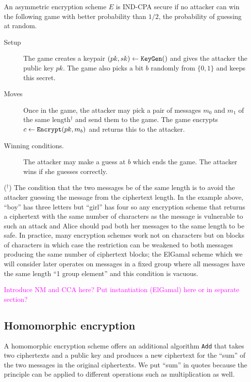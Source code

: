 \documentclass{llncs}
\newcommand{\alg}[1]{\textup{\texttt{#1}}}
\begin{document}
\begin{definition}
An asymmetric encryption scheme $E$ is IND-CPA secure if no attacker can win the
following game with better probability than $1/2$, the probability of guessing
at random.

\begin{description}
\item[Setup] The game creates a keypair $(pk, sk) \gets \alg{KeyGen}()$ and
gives the attacker the public key $pk$. The game also picks a bit $b$ randomly
from $\{0, 1\}$ and keeps this secret.
\item[Moves] Once in the game, the attacker may pick a pair of messages $m_0$
and $m_1$ of the same length$^\dagger$ and send them to the game. The game
encrypts $c \gets \alg{Encrypt} (pk, m_b)$ and returns this to the attacker.
\item[Winning conditions.] The attacker may make a guess at $b$ which ends the
game. The attacker wins if she guesses correctly.
\end{description}
\end{definition}

\noindent($^\dagger$) The condition that the two messages be of the same length
is to avoid the attacker guessing the message from the ciphertext length. In the
example above, ``boy'' has three letters but ``girl'' has four so any encryption
scheme that returns a ciphertext with the same number of characters as the
message is vulnerable to such an attack and Alice should pad both her messages
to the same length to be safe. In practice, many encryption schemes work not on
characters but on blocks of characters in which case the restriction can be
weakened to both messages producing the same number of ciphertext blocks; the
ElGamal scheme which we will consider later operates on messages in a fixed
group where all messages have the same length ``1 group element'' and this
condition is vacuous.

\textcolor{Fuchsia}{Introduce NM and CCA here? Put instantiation (ElGamal) here or in separate section?}

\subsection{Homomorphic encryption}

A homomorphic encryption scheme offers an additional algorithm \alg{Add} that takes two ciphertexts and a public key and produces a new ciphertext for the ``sum'' of the two messages in the original ciphertexts. We put ``sum'' in quotes because the principle can be applied to different operations such as multiplication as well.
\end{document}

